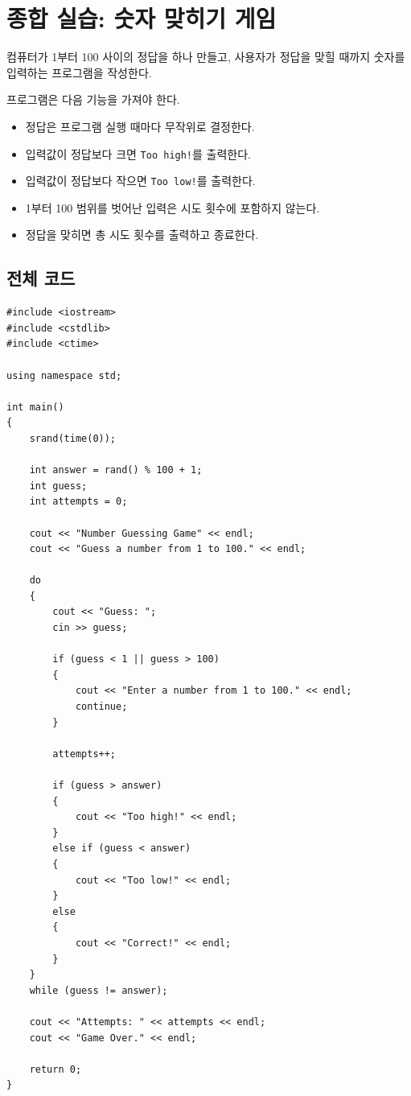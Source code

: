 \documentclass[11pt,a4paper]{article}
\begin{document}
\section{종합 실습: 숫자 맞히기 게임}

컴퓨터가 1부터 100 사이의 정답을 하나 만들고,
사용자가 정답을 맞힐 때까지 숫자를 입력하는 프로그램을 작성한다.

프로그램은 다음 기능을 가져야 한다.

\begin{itemize}
    \item 정답은 프로그램 실행 때마다 무작위로 결정한다.
    \item 입력값이 정답보다 크면 \texttt{Too high!}를 출력한다.
    \item 입력값이 정답보다 작으면 \texttt{Too low!}를 출력한다.
    \item 1부터 100 범위를 벗어난 입력은 시도 횟수에 포함하지 않는다.
    \item 정답을 맞히면 총 시도 횟수를 출력하고 종료한다.
\end{itemize}

\subsection{전체 코드}

\begin{lstlisting}
#include <iostream>
#include <cstdlib>
#include <ctime>

using namespace std;

int main()
{
    srand(time(0));

    int answer = rand() % 100 + 1;
    int guess;
    int attempts = 0;

    cout << "Number Guessing Game" << endl;
    cout << "Guess a number from 1 to 100." << endl;

    do
    {
        cout << "Guess: ";
        cin >> guess;

        if (guess < 1 || guess > 100)
        {
            cout << "Enter a number from 1 to 100." << endl;
            continue;
        }

        attempts++;

        if (guess > answer)
        {
            cout << "Too high!" << endl;
        }
        else if (guess < answer)
        {
            cout << "Too low!" << endl;
        }
        else
        {
            cout << "Correct!" << endl;
        }
    }
    while (guess != answer);

    cout << "Attempts: " << attempts << endl;
    cout << "Game Over." << endl;

    return 0;
}
\end{lstlisting}
\end{document}
